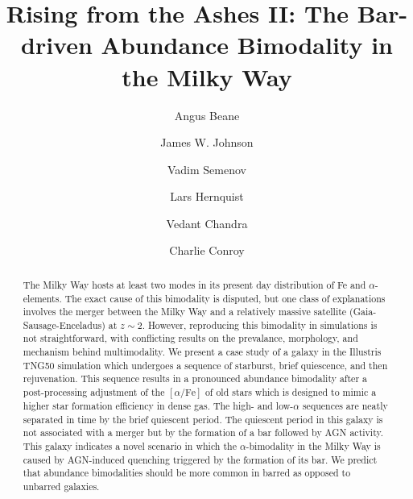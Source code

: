 \documentclass[twocolumn]{aastex631}
\newcommand{\alphaFe}{\ensuremath{[\alpha/\textrm{Fe}]}}
\begin{document}
\title{Rising from the Ashes II: The Bar-driven Abundance Bimodality in the Milky Way}

\author{Angus Beane}

\author{James W. Johnson}

\author{Vadim Semenov}

\author{Lars Hernquist}

\author{Vedant Chandra}

\author{Charlie Conroy}

\begin{abstract}
    The Milky Way hosts at least two modes in its present day distribution of Fe and $\alpha$-elements. The exact cause of this bimodality is disputed, but one class of explanations involves the merger between the Milky Way and a relatively massive satellite (Gaia-Sausage-Enceladus) at $z\sim2$. However, reproducing this bimodality in simulations is not straightforward, with conflicting results on the prevalance, morphology, and mechanism behind multimodality. We present a case study of a galaxy in the Illustris TNG50 simulation which undergoes a sequence of starburst, brief quiescence, and then rejuvenation.
    This sequence results in a pronounced abundance bimodality after a post-processing adjustment of the \alphaFe{} of old stars which is designed to mimic a higher star formation efficiency in dense gas.
    The high- and low-$\alpha$ sequences are neatly separated in time by the brief quiescent period. The quiescent period in this galaxy is not associated with a merger but by the formation of a bar followed by AGN activity. This galaxy indicates a novel scenario in which the $\alpha$-bimodality in the Milky Way is caused by AGN-induced quenching triggered by the formation of its bar. We predict that abundance bimodalities should be more common in barred as opposed to unbarred galaxies.
  \end{abstract}
    
  
\end{document}
